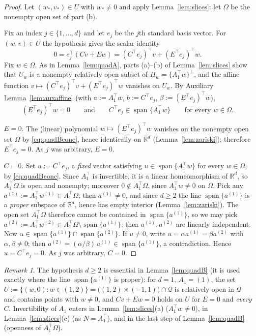 \documentclass[11pt]{article}
\theoremstyle{definition}
\theoremstyle{remark}
\newtheorem{remark}[theorem]{Remark}
\theoremstyle{plain}
\newcommand{\R}{\mathbb{R}}
\newcommand{\cQ}{\mathcal{Q}}
\newcommand{\spn}{\operatorname{span}}
\begin{document}
\begin{proof}
Let $(w_*,v_*)\in U$ with $w_*\neq0$ and apply Lemma~\ref{lem:slices}; let $\Omega$ be
the nonempty open set of part (b).

Fix an index $j\in\{1,\dots,d\}$ and let $e_j$ be the $j$th standard basis vector.  For
$(w,v)\in U$ the hypothesis gives the scalar identity
\[
0=e_j^\top(Cv+Ew)=(C^\top e_j)^\top v+(E^\top e_j)^\top w .
\]
Fix $w\in\Omega$.  As in Lemma~\ref{lem:quadA}, parts (a)--(b) of
Lemma~\ref{lem:slices} show that $U_w$ is a nonempty relatively open subset of
$H_w=\{A_1^\top w\}^\perp$, and the affine function
$v\mapsto(C^\top e_j)^\top v+(E^\top e_j)^\top w$ vanishes on $U_w$.  By Auxiliary
Lemma~\ref{lem:auxaffine} (with $a:=A_1^\top w$, $b:=C^\top e_j$,
$\beta:=(E^\top e_j)^\top w$),
\begin{equation}\label{eq:quadBconc}
(E^\top e_j)^\top w=0\qquad\text{and}\qquad C^\top e_j\in\spn\{A_1^\top w\}
\qquad\text{for every }w\in\Omega .
\end{equation}

\emph{$E=0$.}  The (linear) polynomial $w\mapsto(E^\top e_j)^\top w$ vanishes on the
nonempty open set $\Omega$ by \eqref{eq:quadBconc}, hence identically on $\R^d$
(Lemma~\ref{lem:zariski}); therefore $E^\top e_j=0$.  As $j$ was arbitrary, $E=0$.

\emph{$C=0$.}  Set $u:=C^\top e_j$, a \emph{fixed} vector satisfying
$u\in\spn\{A_1^\top w\}$ for every $w\in\Omega$, by \eqref{eq:quadBconc}.  Since
$A_1^\top$ is invertible, it is a linear homeomorphism of $\R^d$, so $A_1^\top\Omega$ is
open and nonempty; moreover $0\notin A_1^\top\Omega$, since $A_1^\top w\neq0$ on
$\Omega$.  Pick any $a^{(1)}:=A_1^\top w^{(1)}\in A_1^\top\Omega$; then
$a^{(1)}\neq0$, and since $d\ge2$ the line $\spn\{a^{(1)}\}$ is a \emph{proper} subspace
of $\R^d$, hence has empty interior (Lemma~\ref{lem:zariski}).  The open set
$A_1^\top\Omega$ therefore cannot be contained in $\spn\{a^{(1)}\}$, so we may pick
$a^{(2)}:=A_1^\top w^{(2)}\in A_1^\top\Omega\setminus\spn\{a^{(1)}\}$; then
$a^{(1)},a^{(2)}$ are linearly independent.  Now
$u\in\spn\{a^{(1)}\}\cap\spn\{a^{(2)}\}$.  If $u\neq0$, write
$u=\alpha a^{(1)}=\beta a^{(2)}$ with $\alpha,\beta\neq0$; then
$a^{(2)}=(\alpha/\beta)\,a^{(1)}\in\spn\{a^{(1)}\}$, a contradiction.  Hence
$u=C^\top e_j=0$.  As $j$ was arbitrary, $C=0$.
\end{proof}

\begin{remark}\label{rem:rigidity}
The hypothesis $d\ge2$ is essential in Lemma~\ref{lem:quadB} (it is used exactly where
the line $\spn\{a^{(1)}\}$ is proper): for $d=1$, $A_1=(1)$, the set
$U:=\{(w,0):w\in(1,2)\}=\big((1,2)\times(-1,1)\big)\cap\cQ$ is relatively open in $\cQ$
and contains points with $w\neq0$, and $Cv+Ew=0$ holds on $U$ for $E=0$ and \emph{every}
$C$.  Invertibility of $A_1$ enters in Lemma~\ref{lem:slices}(a) ($A_1^\top w\neq0$), in
Lemma~\ref{lem:slices}(c) (as $N=A_1^\top$), and in the last step of
Lemma~\ref{lem:quadB} (openness of $A_1^\top\Omega$).
\end{remark}
\end{document}
